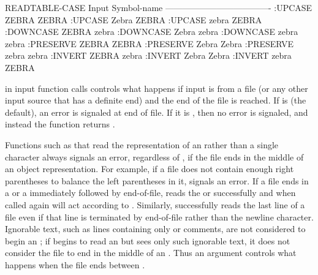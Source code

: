 \code
 READTABLE-CASE     Input Symbol-name
 -------------------------------------
    :UPCASE         ZEBRA   ZEBRA
    :UPCASE         Zebra   ZEBRA
    :UPCASE         zebra   ZEBRA
    :DOWNCASE       ZEBRA   zebra
    :DOWNCASE       Zebra   zebra
    :DOWNCASE       zebra   zebra
    :PRESERVE       ZEBRA   ZEBRA
    :PRESERVE       Zebra   Zebra
    :PRESERVE       zebra   zebra
    :INVERT         ZEBRA   zebra
    :INVERT         Zebra   Zebra
    :INVERT         zebra   ZEBRA
\endcode

\endsubsubsection%

\endsubsection%




 in input function calls
controls what happens if input is from a file (or any other
input source that has a definite end) and the end of the file is reached.
If  is  (the default), 
an error  is signaled
at end of file.  If it is , then no error is signaled, and instead
the function returns .

Functions such as  that read the representation
of an  rather than a single
character always signals an error, regardless of , if
the file ends in the middle of an object representation.
For example, if a file does
not contain enough right parentheses to balance the left parentheses in
it,  signals an error.  If a file ends in a 
 or a 
immediately followed by end-of-file,  reads the 
 or
successfully and when called again will
act according to .
Similarly, 
successfully reads the last line of a file even if that line
is terminated by end-of-file rather than the newline character.
Ignorable text, such as lines containing only  or comments,
are not considered to begin an ; 
if  begins to read an  but sees only such
ignorable text, it does not consider the file to end in the middle of an .
Thus an  argument controls what happens
when the file ends between .

